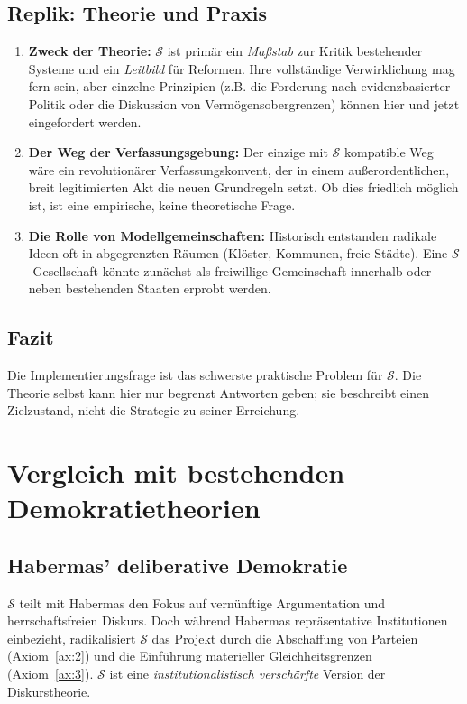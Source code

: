 \subsection{Replik: Theorie und Praxis}
\begin{enumerate}
    \item \textbf{Zweck der Theorie:} $\mathcal{S}$ ist primär ein \emph{Maßstab} zur Kritik bestehender Systeme und ein \emph{Leitbild} für Reformen. Ihre vollständige Verwirklichung mag fern sein, aber einzelne Prinzipien (z.B. die Forderung nach evidenzbasierter Politik oder die Diskussion von Vermögensobergrenzen) können hier und jetzt eingefordert werden.
    \item \textbf{Der Weg der Verfassungsgebung:} Der einzige mit $\mathcal{S}$ kompatible Weg wäre ein revolutionärer Verfassungskonvent, der in einem außerordentlichen, breit legitimierten Akt die neuen Grundregeln setzt. Ob dies friedlich möglich ist, ist eine empirische, keine theoretische Frage.
    \item \textbf{Die Rolle von Modellgemeinschaften:} Historisch entstanden radikale Ideen oft in abgegrenzten Räumen (Klöster, Kommunen, freie Städte). Eine $\mathcal{S}$-Gesellschaft könnte zunächst als freiwillige Gemeinschaft innerhalb oder neben bestehenden Staaten erprobt werden.
\end{enumerate}

\subsection{Fazit}
Die Implementierungsfrage ist das schwerste praktische Problem für $\mathcal{S}$. Die Theorie selbst kann hier nur begrenzt Antworten geben; sie beschreibt einen Zielzustand, nicht die Strategie zu seiner Erreichung.

\section{Vergleich mit bestehenden Demokratietheorien}

\subsection{Habermas' deliberative Demokratie}
$\mathcal{S}$ teilt mit Habermas den Fokus auf vernünftige Argumentation und herrschaftsfreien Diskurs. Doch während Habermas repräsentative Institutionen einbezieht, radikalisiert $\mathcal{S}$ das Projekt durch die Abschaffung von Parteien (Axiom~\ref{ax:2}) und die Einführung materieller Gleichheitsgrenzen (Axiom~\ref{ax:3}). $\mathcal{S}$ ist eine \emph{institutionalistisch verschärfte} Version der Diskurstheorie.

